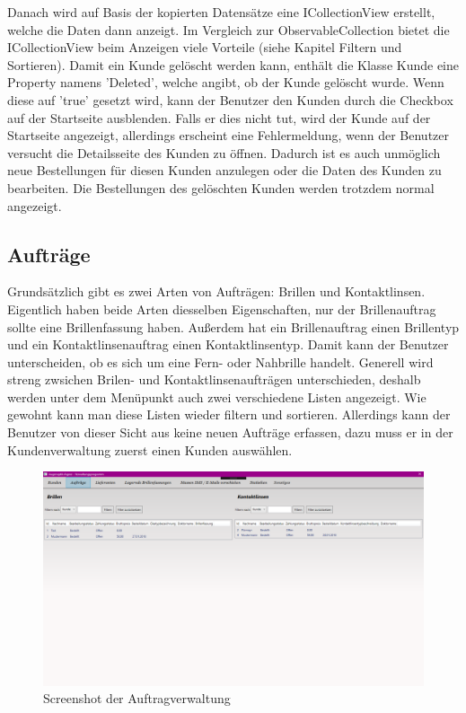 Danach wird auf Basis der kopierten Datensätze eine ICollectionView erstellt, welche die Daten dann anzeigt. Im Vergleich zur ObservableCollection bietet die ICollectionView beim Anzeigen viele Vorteile (siehe Kapitel Filtern und Sortieren). 
Damit ein Kunde gelöscht werden kann, enthält die Klasse Kunde eine Property namens 'Deleted', welche angibt, ob der Kunde gelöscht wurde. Wenn diese auf 'true' gesetzt wird, kann der Benutzer den Kunden durch die Checkbox auf der Startseite ausblenden. Falls er dies nicht tut, wird der Kunde auf der Startseite angezeigt, allerdings erscheint eine Fehlermeldung, wenn der Benutzer versucht die Detailsseite des Kunden zu öffnen. Dadurch ist es auch unmöglich neue Bestellungen für diesen Kunden anzulegen oder die Daten des Kunden zu bearbeiten. Die Bestellungen des gelöschten Kunden werden trotzdem normal angezeigt.
\subsection{Aufträge}
Grundsätzlich gibt es zwei Arten von Aufträgen: Brillen und Kontaktlinsen. Eigentlich haben beide Arten diesselben Eigenschaften, nur der Brillenauftrag sollte eine Brillenfassung haben. Außerdem hat ein Brillenauftrag einen Brillentyp und ein Kontaktlinsenauftrag einen Kontaktlinsentyp. Damit kann der Benutzer unterscheiden, ob es sich um eine Fern- oder Nahbrille handelt. Generell wird streng zwsichen Brilen- und Kontaktlinsenaufträgen unterschieden, deshalb werden unter dem Menüpunkt auch zwei verschiedene Listen angezeigt. Wie gewohnt kann man diese Listen wieder filtern und sortieren. Allerdings kann der Benutzer von dieser Sicht aus keine neuen Aufträge erfassen, dazu muss er in der Kundenverwaltung zuerst einen Kunden auswählen. 
\begin{figure}[H]
\begin{center}
	\includegraphics[scale=.25]{images/Auftraege.png}
\end{center}
	\caption{Screenshot der Auftragverwaltung}
	\label{fig:sample}
\end{figure}
